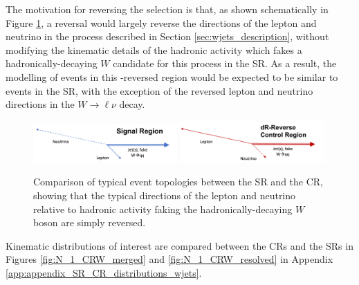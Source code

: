 The motivation for reversing the \DeltaR selection is that, as shown schematically in Figure \ref{fig:CRW_topology}, a \DeltaR reversal would largely reverse the directions of the lepton and neutrino in the \wjets process described in Section \ref{sec:wjets_description}, without modifying the kinematic details of the hadronic activity which fakes a hadronically-decaying \(W\) candidate for this process in the SR. As a result, the modelling of \wjets events in this \DeltaR-reversed region would be expected to be similar to \wjets events in the SR, with the exception of the reversed lepton and neutrino directions in the \(W\rightarrow\ell\nu\) decay.

\begin{figure}[htbp]
  \centering
  \includegraphics[width=0.49\textwidth]{figures/5/SR_topology.pdf}
  \includegraphics[width=0.49\textwidth]{figures/5/CRW_topology.pdf}
  \caption[Topologies in SR vs. CRW]{Comparison of typical event topologies between the SR and the \wjets CR, showing that the typical directions of the lepton and neutrino relative to hadronic activity faking the hadronically-decaying \(W\) boson are simply reversed.}
  \label{fig:CRW_topology}
\end{figure}

Kinematic distributions of interest are compared between the \wjets CRs and the SRs in Figures \ref{fig:N_1_CRW_merged} and \ref{fig:N_1_CRW_resolved} in Appendix \ref{app:appendix_SR_CR_distributions_wjets}. 

